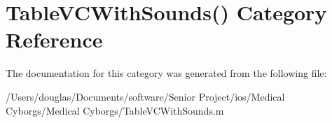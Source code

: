 \hypertarget{category_table_v_c_with_sounds_07_08}{\section{Table\-V\-C\-With\-Sounds() Category Reference}
\label{category_table_v_c_with_sounds_07_08}
}


The documentation for this category was generated from the following file\-:\begin{DoxyCompactItemize}
\item 
/\-Users/douglas/\-Documents/software/\-Senior Project/ios/\-Medical Cyborgs/\-Medical Cyborgs/Table\-V\-C\-With\-Sounds.\-m\end{DoxyCompactItemize}
